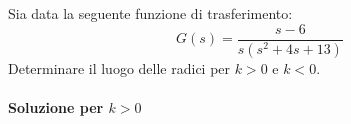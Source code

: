 \begin{esercizio}
Sia data la seguente funzione di trasferimento:
\[
	G(s) = \frac{s-6}{s(s^2+4s+13)}
\]
Determinare il luogo delle radici per \(k>0\) e \(k<0\).

\paragraph{Soluzione per \(k>0\)}

\begin{figure}[ht]
	\centering
\end{figure}


\end{esercizio}
